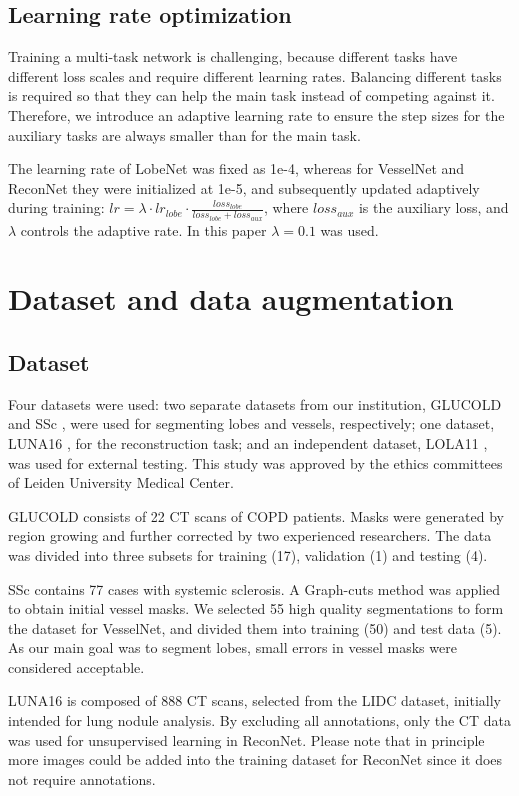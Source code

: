 \subsection{Learning rate optimization}
Training a multi-task network is challenging, because different tasks have different loss scales and require different learning rates. Balancing different tasks is required so that they can help the main task instead of competing against it. Therefore, we introduce an adaptive learning rate to ensure the step sizes for the auxiliary tasks are always smaller than for the main task.

The learning rate of LobeNet was fixed as 1e-4, whereas for VesselNet and ReconNet they were initialized at 1e-5, and subsequently updated adaptively during training: $lr=\lambda \cdot lr_{lobe} \cdot \frac{loss_{lobe}}{loss_{lobe}+loss_{aux}}$, where $loss_{aux}$ is the auxiliary loss, and $\lambda$ controls the adaptive rate. In this paper $\lambda = 0.1$ was used. 


\section{Dataset and data augmentation}
\subsection{Dataset}
Four datasets were used: two separate datasets from our institution, GLUCOLD \cite{xiao2016pulmonary} and SSc \cite{zhai2019automatic}, were used for segmenting lobes and vessels, respectively; one dataset, LUNA16 \cite{setio2017validation}, for the reconstruction task; and an independent dataset, LOLA11 \cite{xiao2016pulmonary}, was used for external testing. This study was approved by the ethics committees of Leiden University Medical Center.

GLUCOLD consists of 22 CT scans of COPD patients. Masks were generated by region growing and further corrected by two experienced researchers. The data was divided into three subsets for training (17), validation (1) and testing (4).

SSc contains 77 cases with systemic sclerosis. A Graph-cuts method \cite{zhai2016lung} was applied to obtain initial vessel masks.  We selected 55 high quality segmentations to form the dataset for VesselNet, and divided them into training (50) and test data (5). As our main goal was to segment lobes, small errors in vessel masks were considered acceptable.

LUNA16 is composed of 888 CT scans, selected from the LIDC dataset, initially intended for lung nodule analysis. By excluding all annotations, only the CT data was used for unsupervised learning in ReconNet. Please note that in principle more images could be added into the training dataset for ReconNet since it does not require annotations.

